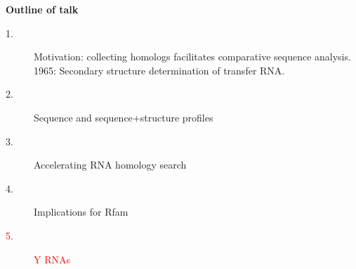\documentclass[landscape]{slides}
\begin{document}
\begin{slide}
\begin{center}
\textbf{Outline of talk}

\begin{description}
\item[1.] Motivation: collecting homologs facilitates comparative
  sequence analysis.\\ 1965: Secondary structure determination of
  transfer RNA.
\item[2.] Sequence and sequence+structure profiles
\item[3.] Accelerating RNA homology search
\item[4.] Implications for Rfam
\item[\textcolor{red}{5.}] \textcolor{red}{Y RNAs}
\end{description}

\end{center}
\vfill
\end{slide}
\end{document}
